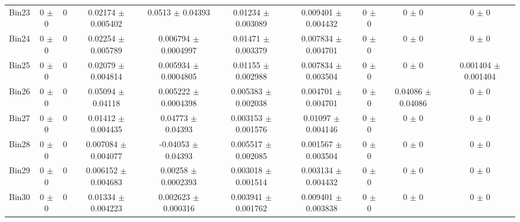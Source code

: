 \begin{tabular}{@{\extracolsep{4pt}}lccccccccc@{}}
     Bin23 & 0 $\pm$ 0 & 0 & 0.02174 $\pm$ 0.005402 & 0.0513 $\pm$ 0.04393 & 0.01234 $\pm$ 0.003089 & 0.009401 $\pm$ 0.004432 & 0 $\pm$ 0 & 0 $\pm$ 0 & 0 $\pm$ 0 \\ 
     Bin24 & 0 $\pm$ 0 & 0 & 0.02254 $\pm$ 0.005789 & 0.006794 $\pm$ 0.0004997 & 0.01471 $\pm$ 0.003379 & 0.007834 $\pm$ 0.004701 & 0 $\pm$ 0 & 0 $\pm$ 0 & 0 $\pm$ 0 \\ 
     Bin25 & 0 $\pm$ 0 & 0 & 0.02079 $\pm$ 0.004814 & 0.005934 $\pm$ 0.0004805 & 0.01155 $\pm$ 0.002988 & 0.007834 $\pm$ 0.003504 & 0 $\pm$ 0 & 0 $\pm$ 0 & 0.001404 $\pm$ 0.001404 \\ 
     Bin26 & 0 $\pm$ 0 & 0 & 0.05094 $\pm$ 0.04118 & 0.005222 $\pm$ 0.0004398 & 0.005383 $\pm$ 0.002038 & 0.004701 $\pm$ 0.004701 & 0 $\pm$ 0 & 0.04086 $\pm$ 0.04086 & 0 $\pm$ 0 \\ 
     Bin27 & 0 $\pm$ 0 & 0 & 0.01412 $\pm$ 0.004435 & 0.04773 $\pm$ 0.04393 & 0.003153 $\pm$ 0.001576 & 0.01097 $\pm$ 0.004146 & 0 $\pm$ 0 & 0 $\pm$ 0 & 0 $\pm$ 0 \\ 
     Bin28 & 0 $\pm$ 0 & 0 & 0.007084 $\pm$ 0.004077 & -0.04053 $\pm$ 0.04393 & 0.005517 $\pm$ 0.002085 & 0.001567 $\pm$ 0.003504 & 0 $\pm$ 0 & 0 $\pm$ 0 & 0 $\pm$ 0 \\ 
     Bin29 & 0 $\pm$ 0 & 0 & 0.006152 $\pm$ 0.004683 & 0.00258 $\pm$ 0.0002393 & 0.003018 $\pm$ 0.001514 & 0.003134 $\pm$ 0.004432 & 0 $\pm$ 0 & 0 $\pm$ 0 & 0 $\pm$ 0 \\ 
     Bin30 & 0 $\pm$ 0 & 0 & 0.01334 $\pm$ 0.004223 & 0.002623 $\pm$ 0.000316 & 0.003941 $\pm$ 0.001762 & 0.009401 $\pm$ 0.003838 & 0 $\pm$ 0 & 0 $\pm$ 0 & 0 $\pm$ 0 \\ 
\hline\hline
  \end{tabular}
